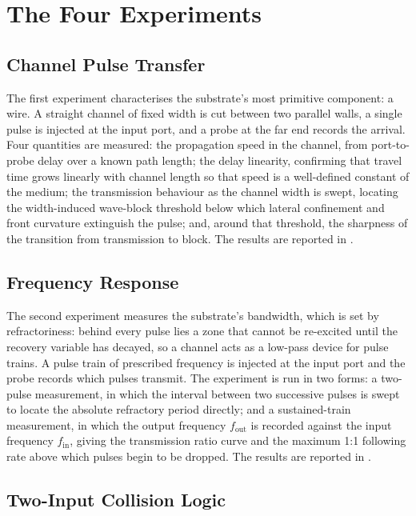 \section{The Four Experiments}
\label{sec:meth_experiments}

\subsection{Channel Pulse Transfer}
\label{sec:meth_exp_channel}


The first experiment characterises the substrate's most primitive component: a wire.
A straight channel of fixed width is cut between two parallel walls, a single pulse is injected at the input port, and a probe at the far end records the arrival.
Four quantities are measured: the propagation speed in the channel, from port-to-probe delay over a known path length;
the delay linearity, confirming that travel time grows linearly with channel length so that speed is a well-defined constant of the medium;
the transmission behaviour as the channel width is swept, locating the width-induced wave-block threshold below which lateral confinement and front curvature extinguish the pulse;
and, around that threshold, the sharpness of the transition from transmission to block.
The results are reported in .

\subsection{Frequency Response}
\label{sec:meth_exp_frequency}

The second experiment measures the substrate's bandwidth, which is set by refractoriness: behind every pulse lies a zone that cannot be re-excited until the recovery variable has decayed, so a channel acts as a low-pass device for pulse trains.
A pulse train of prescribed frequency is injected at the input port and the probe records which pulses transmit.
The experiment is run in two forms: a two-pulse measurement, in which the interval between two successive pulses is swept to locate the absolute refractory period directly; and a sustained-train measurement, in which the output frequency $f_{\mathrm{out}}$ is recorded against the input frequency $f_{\mathrm{in}}$, giving the transmission ratio curve and the maximum 1:1 following rate above which pulses begin to be dropped.
The results are reported in .

\subsection{Two-Input Collision Logic}
\label{sec:meth_exp_logic}

